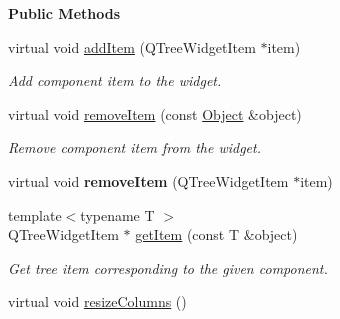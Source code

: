 \begin{Indent}\textbf{ Public Methods}\par
\begin{DoxyCompactItemize}
\item 
\mbox{\label{classrev_1_1_view_1_1_tree_widget_a86665fed8e824cdd1ea7d7df4e1ab34c}} 
virtual void \mbox{\hyperlink{classrev_1_1_view_1_1_tree_widget_a86665fed8e824cdd1ea7d7df4e1ab34c}{add\+Item}} (Q\+Tree\+Widget\+Item $\ast$item)
\begin{DoxyCompactList}\small\item\em Add component item to the widget. \end{DoxyCompactList}\item 
\mbox{\label{classrev_1_1_view_1_1_tree_widget_a299dffb0940c6585148fbacbb3e2822f}} 
virtual void \mbox{\hyperlink{classrev_1_1_view_1_1_tree_widget_a299dffb0940c6585148fbacbb3e2822f}{remove\+Item}} (const \mbox{\hyperlink{classrev_1_1_object}{Object}} \&object)
\begin{DoxyCompactList}\small\item\em Remove component item from the widget. \end{DoxyCompactList}\item 
\mbox{\label{classrev_1_1_view_1_1_tree_widget_ae0e3d6567d0fde7c621a23c2cf24f95d}} 
virtual void {\bfseries remove\+Item} (Q\+Tree\+Widget\+Item $\ast$item)
\item 
\mbox{\label{classrev_1_1_view_1_1_tree_widget_a2641074b3c2f4961bce2fe50f265fbac}} 
{\footnotesize template$<$typename T $>$ }\\Q\+Tree\+Widget\+Item $\ast$ \mbox{\hyperlink{classrev_1_1_view_1_1_tree_widget_a2641074b3c2f4961bce2fe50f265fbac}{get\+Item}} (const T \&object)
\begin{DoxyCompactList}\small\item\em Get tree item corresponding to the given component. \end{DoxyCompactList}\item 
\mbox{\label{classrev_1_1_view_1_1_tree_widget_a8726ce77359255381a9a564646757a14}} 
virtual void \mbox{\hyperlink{classrev_1_1_view_1_1_tree_widget_a8726ce77359255381a9a564646757a14}{resize\+Columns}} ()

\end{DoxyCompactItemize}
\end{Indent}
